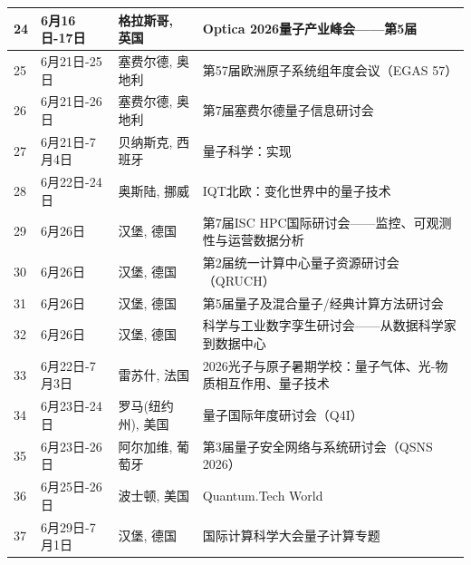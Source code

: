 \documentclass[12pt,a4paper]{ctexart}
\begin{document}
{\begin{longtable}{C{0.8cm}L{2.5cm}L{3cm}L{7cm}}
        24 & 6月16日-17日 & 格拉斯哥, 英国 & Optica 2026量子产业峰会——第5届 \\
        \midrule[0.05pt]
        
        25 & 6月21日-25日 & 塞费尔德, 奥地利 & 第57届欧洲原子系统组年度会议（EGAS 57） \\
        \midrule[0.05pt]
        
        26 & 6月21日-26日 & 塞费尔德, 奥地利 & 第7届塞费尔德量子信息研讨会 \\
        \midrule[0.05pt]
        
        27 & 6月21日-7月4日 & 贝纳斯克, 西班牙 & 量子科学：实现 \\
        \midrule[0.05pt]
        
        28 & 6月22日-24日 & 奥斯陆, 挪威 & IQT北欧：变化世界中的量子技术 \\
        \midrule[0.05pt]
        
        29 & 6月26日 & 汉堡, 德国 & 第7届ISC HPC国际研讨会——监控、可观测性与运营数据分析 \\
        \midrule[0.05pt]
        
        30 & 6月26日 & 汉堡, 德国 & 第2届统一计算中心量子资源研讨会（QRUCH） \\
        \midrule[0.05pt]
        
        31 & 6月26日 & 汉堡, 德国 & 第5届量子及混合量子/经典计算方法研讨会 \\
        \midrule[0.05pt]
        
        32 & 6月26日 & 汉堡, 德国 & 科学与工业数字孪生研讨会——从数据科学家到数据中心 \\
        \midrule[0.05pt]
        
        33 & 6月22日-7月3日 & 雷苏什, 法国 & 2026光子与原子暑期学校：量子气体、光-物质相互作用、量子技术 \\
        \midrule[0.05pt]
        
        34 & 6月23日-24日 & 罗马(纽约州), 美国 & 量子国际年度研讨会（Q4I） \\
        \midrule[0.05pt]
        
        35 & 6月23日-26日 & 阿尔加维, 葡萄牙 & 第3届量子安全网络与系统研讨会（QSNS 2026） \\
        \midrule[0.05pt]
        
        36 & 6月25日-26日 & 波士顿, 美国 & Quantum.Tech World \\
        \midrule[0.05pt]
        
        37 & 6月29日-7月1日 & 汉堡, 德国 & 国际计算科学大会量子计算专题 \\
        \midrule[0.05pt]
        

\end{longtable}}
\end{document}
